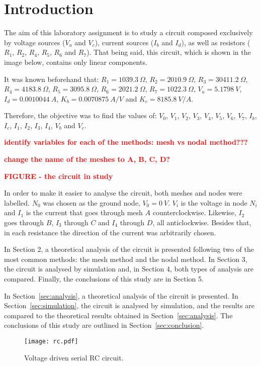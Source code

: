 \section{Introduction}
\label{sec:introduction}

\par
The aim of this laboratory assignment is to study a circuit composed exclusively by voltage sources ($V_a$ and $V_c$), current sources ($I_b$ and $I_d$), as well as resistors ($R_1$, $R_2$, $R_4$, $R_5$, $R_6$ and $R_7$). That being said, this circuit, which is shown in the image below, contains only linear components.

\par
It was known beforehand that:
$R_1 = 1039.3 \ \Omega$,
$R_2 = 2010.9 \ \Omega$,
$R_3 = 30411.2 \ \Omega$,
$R_4 = 4183.8 \ \Omega$,
$R_5 = 3095.8 \ \Omega$,
$R_6 = 2021.2 \ \Omega$,
$R_7 = 1022.3 \ \Omega$,
$V_a = 5.1798 \ V$,
$I_d = 0.0010044 \ A$,
$K_b = 0.0070875 \ A/V$ and
$K_c = 8185.8 \ V/A$.

\par
Therefore, the objective was to find the values of: $V_0$, $V_1$, $V_2$, $V_3$, $V_4$, $V_5$, $V_6$, $V_7$, $I_b$, $I_c$, $I_1$, $I_2$, $I_3$, $I_4$, $V_b$ and $V_c$.

\par
\textcolor{red}{\textbf{identify variables for each of the methods: mesh vs nodal method???}}
\par
\textcolor{red}{\textbf{change the name of the meshes to A, B, C, D?}}
\par
\textcolor{red}{\textbf{FIGURE - the circuit in study}}

\par
In order to make it easier to analyse the circuit, both meshes and nodes were labelled. $N_0$ was chosen as the ground node, $V_0 = 0 \ V$. $V_i$ is the voltage in node $N_i$ and $I_1$ is the current that goes through mesh $A$ counterclockwise. Likewise, $I_2$ goes through $B$, $I_3$ through $C$ and $I_4$ through $D$, all anticlockwise. Besides that, in each resistance the direction of the current was arbitrarily chosen.

\par
In Section 2, a theoretical analysis of the circuit is presented following two of the most common methods: the mesh method and the nodal method. In Section 3, the circuit is analysed by simulation and, in Section 4, both types of analysis are compared. Finally, the conclusions of this study are in Section 5.




In Section~\ref{sec:analysis}, a theoretical analysis of the circuit is
presented. In Section~\ref{sec:simulation}, the circuit is analysed by
simulation, and the results are compared to the theoretical results obtained in
Section~\ref{sec:analysis}. The conclusions of this study are outlined in
Section~\ref{sec:conclusion}.

\begin{figure}[h] \centering
\texttt{[image: rc.pdf]}
\caption{Voltage driven serial RC circuit.}
\label{fig:rc}
\end{figure}

